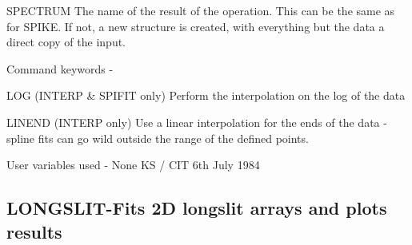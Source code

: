 \begin{description}
\begin{description}
\begin{terminalv}
 SPECTRUM   The name of the result of the operation.  This can
            be the same as for SPIKE.  If not, a new structure
            is created, with everything but the data a direct
            copy of the input.

 Command keywords  -

 LOG        (INTERP & SPIFIT only) Perform the interpolation on
            the log of the data

 LINEND     (INTERP only) Use a linear interpolation for the
            ends of the data - spline fits can go wild outside the
            range of the defined points.

 User variables used - None
                                  KS / CIT 6th July 1984

\end{terminalv}
\end{description}
\subsection{LONGSLIT-\label{LONGSLIT}Fits 2D longslit arrays and plots results}
\begin{description}


\end{description}
\end{description}
